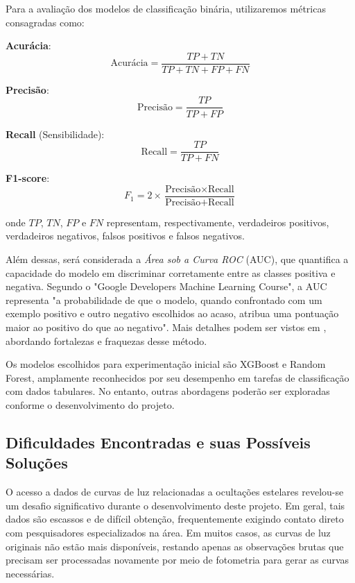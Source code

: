 \documentclass[12pt]{article}
\numberwithin{equation}{section}
\begin{document}
Para a avaliação dos modelos de classificação binária, utilizaremos métricas consagradas como:

\textbf{Acurácia}:
\[
\text{Acurácia} = \frac{TP + TN}{TP + TN + FP + FN}
\]

\textbf{Precisão}:
\[
\text{Precisão} = \frac{TP}{TP + FP}
\]

\textbf{Recall} (Sensibilidade):
\[
\text{Recall} = \frac{TP}{TP + FN}
\]

\textbf{F1-score}:
\[
F_1 = 2 \times \frac{\text{Precisão} \times \text{Recall}}{\text{Precisão} + \text{Recall}}
\]

onde \(TP\), \(TN\), \(FP\) e \(FN\) representam, respectivamente, verdadeiros positivos, verdadeiros negativos, falsos positivos e falsos negativos.

Além dessas, será considerada a \textit{Área sob a Curva ROC} (AUC), que quantifica a capacidade do modelo em discriminar corretamente entre as classes positiva e negativa. Segundo o "Google Developers Machine Learning Course", a AUC representa "a probabilidade de que o modelo, quando confrontado com um exemplo positivo e outro negativo escolhidos ao acaso, atribua uma pontuação maior ao positivo do que ao negativo". Mais detalhes podem ser vistos em \cite{AUC-curve}, abordando fortalezas e fraquezas desse método.

Os modelos escolhidos para experimentação inicial são XGBoost e Random Forest, amplamente reconhecidos por seu desempenho em tarefas de classificação com dados tabulares. No entanto, outras abordagens poderão ser exploradas conforme o desenvolvimento do projeto.





\subsection{Dificuldades Encontradas e suas Possíveis Soluções}
\indent
O acesso a dados de curvas de luz relacionadas a ocultações estelares revelou-se um desafio significativo durante o desenvolvimento deste projeto. Em geral, tais dados são escassos e de difícil obtenção, frequentemente exigindo contato direto com pesquisadores especializados na área. Em muitos casos, as curvas de luz originais não estão mais disponíveis, restando apenas as observações brutas que precisam ser processadas novamente por meio de fotometria para gerar as curvas necessárias.
\end{document}
